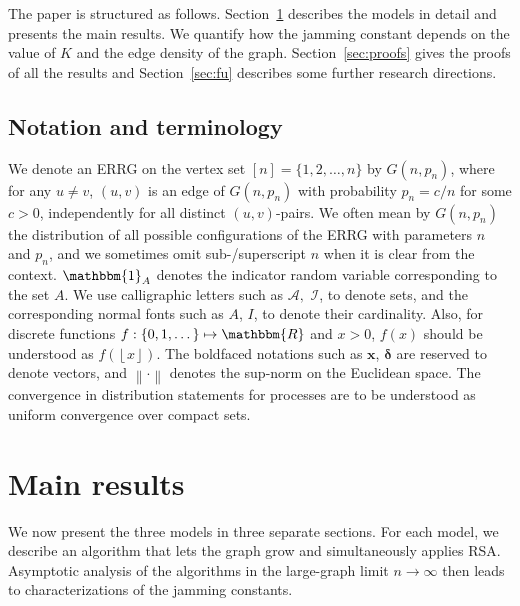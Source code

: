 \documentclass[11pt,a4paper, reqno]{article}
\begin{document}
The paper is structured as follows. Section~\ref{sec:results} describes the models in detail and presents the main results. We quantify how the jamming constant depends on the value of $K$ and the edge density of the graph. Section~\ref{sec:proofs} gives the proofs of all the results and Section~\ref{sec:fu} describes some further research directions.

\subsection*{Notation and terminology}  We denote an ERRG on the vertex set $[n]=\{1,2,\dots,n\}$  by $G(n,p_n)$, where for any $u\neq v$, $(u,v)$ is an edge of $G(n,p_n)$ with probability $p_n=c/n$ for some $c>0$, independently for all distinct $(u,v)$-pairs.
We often mean by $G(n,p_n)$ the distribution of all possible configurations of the ERRG with parameters $n$ and $p_n$, and we sometimes omit sub-/superscript $n$ when it is clear from the context. 
${\ensuremath{\mathbbm{1}}}_A$ denotes the indicator random variable corresponding to the set $A$.
We use calligraphic letters such as $\mathcal{A},$ $\mathcal{I}$, to denote sets, and the corresponding normal fonts such as $A$, $I$, to denote their cardinality.
Also, for discrete functions $f:\{0,1,\dots\}\mapsto {\mathbbm{R}}$ and $x>0$, $f(x)$ should be understood as $f({\ensuremath{\left\lfloor {x} \right\rfloor}})$. The boldfaced notations such as ${\ensuremath{\boldsymbol{{x}}}}$, ${\ensuremath{\boldsymbol{{\delta}}}}$ are reserved to denote vectors, and ${\ensuremath{\left\|{\cdot}\right\|}}$ denotes the sup-norm on the Euclidean space. The convergence in distribution statements for processes are to be understood as uniform convergence over compact sets.

\section{Main results}\label{sec:results}
We now present  the three models in three separate sections. For each model, we describe an algorithm that lets the graph grow and simultaneously applies RSA. Asymptotic analysis of the algorithms in the large-graph limit $n\to\infty$ then leads to characterizations of the jamming constants. 
\end{document}
